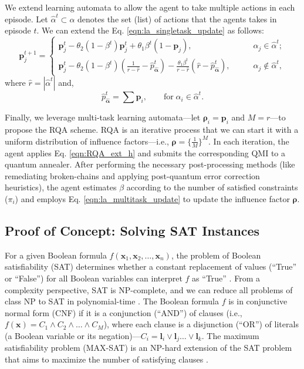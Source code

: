 \documentclass[fleqn,10pt]{wlscirep}
\begin{document}
We extend learning automata to allow the agent to take multiple actions in each episode. Let $\hat{{\alpha}}^t \subset {\alpha}$ denotes the set (list) of actions that the agents takes in episode ${t}$. We can extend the Eq. \eqref{eqn:la_singletask_update} as follows:
\begin{equation}
	\label{eqn:la_multitask_update}
	\boldsymbol{p}_j^{t+1} = 
	\begin{cases}
		\boldsymbol{p}_j^{t} -\theta_2 \left({1-\beta^{t}}\right) \boldsymbol{p}_j^{t} + \theta_1 \beta^{t} \left({1-\boldsymbol{p}_j}\right), \quad \quad  & {\alpha}_j \in \hat{{\alpha}}^{t};\\
		\boldsymbol{p}_{j}^{t} - \theta_2 \left({1-\beta^{t}}\right) \left({\frac{1}{r-\hat{r}}- \hat{p}_{\hat{\boldsymbol{\alpha}}}^{t}}\right) - \frac{\theta_1 \beta^{t}}{r-\hat{r}} \left({\hat{r} - \hat{p}_{\hat{\boldsymbol{\alpha}}}^{t}}\right), \quad \quad  & {\alpha}_j \notin \hat{{\alpha}}^{t},
	\end{cases}
\end{equation}
where $\hat{r} = \left|{\hat{\alpha}^t} \right|$ and, 
\[
	\hat{p}_{\hat{\boldsymbol{\alpha}}}^t = \sum{\boldsymbol{p}}_i, \quad \quad \text{for} \; {\alpha}_i \in \hat{{\alpha}}^{t}.
\]

Finally, we leverage multi-task learning automata—let $\boldsymbol{\rho}_i = \boldsymbol{p}_i$ and $M=r$—to propose the RQA scheme. RQA is an iterative process that we can start it with a uniform distribution of influence factors—i.e., $\boldsymbol{\rho}= \{\frac{1}{M} \}^M$. In each iteration, the agent applies Eq. \eqref{eqn:RQA_ext_h} and submits the corresponding QMI to a quantum annealer.
After performing the necessary post-processing methods (like remediating broken-chains and applying post-quantum error correction heuristics), the agent estimates $\beta$ according to the number of satisfied constraints ($\pi_i$) and employs Eq. \eqref{eqn:la_multitask_update} to update the influence factor $\boldsymbol{\rho}$.

\subsection*{Proof of Concept: Solving SAT Instances}
For a given Boolean formula $f\left(\mathbf{x}_1, \mathbf{x}_2, \dots, \mathbf{x}_n\right)$, the problem of Boolean satisfiability (SAT) determines whether a constant replacement of values (“True” or “False”) for all Boolean variables can interpret ${f}$ as “True” \cite{biere2009handbook}. From a complexity perspective, SAT is NP-complete, and we can reduce all problems of class NP to SAT in polynomial-time \cite{garey2002computers}. The Boolean formula ${f}$ is in conjunctive normal form (CNF) if it is a conjunction (“AND”) of clauses (i.e., $f(\mathbf{x}) = C_1 \wedge C_2 \wedge \dots \wedge C_M$), where each clause is a disjunction (“OR”) of literals (a Boolean variable or its negation)—$C_i = \mathbf{l}_i \vee \mathbf{l}_j \dots \vee \mathbf{l}_k$. The maximum satisfiability problem (MAX-SAT) is an NP-hard extension of the SAT problem that aims to maximize the number of satisfying clauses \cite{biere2009handbook,ayanzadeh2019sat}.
\end{document}
